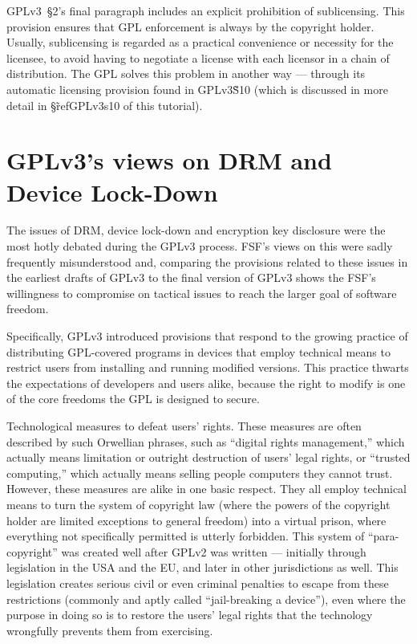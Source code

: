 GPLv3~\S2's final paragraph includes an explicit prohibition of sublicensing.
This provision ensures that GPL enforcement is always by the copyright
holder.  Usually, sublicensing is regarded as a practical convenience or
necessity for the licensee, to avoid having to negotiate a license with each
licensor in a chain of distribution.  The GPL solves this problem in another
way --- through its automatic licensing provision found in GPLv3\~S10 (which
is discussed in more detail in \S\~ref{GPLv3s10} of this tutorial).

\section{GPLv3's views on DRM and Device Lock-Down}
\label{GPLv3-drm}

The issues of DRM, device lock-down and encryption key disclosure were the
most hotly debated during the GPLv3 process.  FSF's views on this were sadly
frequently misunderstood and, comparing the provisions related to these
issues in the earliest drafts of GPLv3 to  the final version of GPLv3 shows
the FSF's willingness to compromise on tactical issues to reach the larger
goal of software freedom.

Specifically, GPLv3 introduced provisions that respond to the growing
practice of distributing GPL-covered programs in devices that employ
technical means to restrict users from installing and running modified
versions.  This practice thwarts the expectations of developers and users
alike, because the right to modify is one of the core freedoms the GPL is
designed to secure.

Technological measures to defeat users' rights.  These measures are often
described by such Orwellian phrases, such as ``digital rights management,''
which actually means limitation or outright destruction of users' legal
rights, or ``trusted computing,'' which actually means selling people
computers they cannot trust.  However, these measures are alike in one basic
respect.  They all employ technical means to turn the system of copyright law
(where the powers of the copyright holder are limited exceptions to general
freedom) into a virtual prison, where everything not specifically permitted
is utterly forbidden.  This system of ``para-copyright'' was created well
after GPLv2 was written --- initially through legislation in the USA and the
EU, and later in other jurisdictions as well.  This legislation creates
serious civil or even criminal penalties to escape from these restrictions
(commonly and aptly called ``jail-breaking a device''), even where the
purpose in doing so is to restore the users' legal rights that the technology
wrongfully prevents them from exercising.

